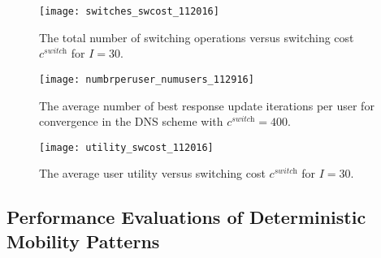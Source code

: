 \documentclass[journal]{IEEEtran}
\begin{document}
\begin{figure*}[t]
\hspace{-0.5cm}
\centering
%
\begin{minipage}[t]{0.3\linewidth}
       \texttt{[image: switches\_swcost\_112016]} %
   \caption{The total number of switching operations versus switching cost $c^{\textit{switch}}$ for $I = 30$.}
   \label{fig:switches_swcost}
\end{minipage}
% 
\quad
%
\begin{minipage}[t]{0.3\linewidth}
       \texttt{[image: numbrperuser\_numusers\_112916]} 
   \caption{The average number of best response update iterations per user for convergence in the DNS scheme with $c^{\textit{switch}} = 400$.}
   \label{fig:numbrperuser_numusers}
\end{minipage}	
%
\quad
%
\begin{minipage}[t]{0.3\linewidth}
       \texttt{[image: utility\_swcost\_112016]} %
   \caption{The average user utility versus switching cost $c^{\textit{switch}}$ for $I = 30$.}
   \label{fig:utility_swcost}
\end{minipage}
%
\vspace{-0.2cm}
\end{figure*}





\subsection{Performance Evaluations of Deterministic Mobility Patterns} \label{sec:pe_deterministic}
\end{document}
